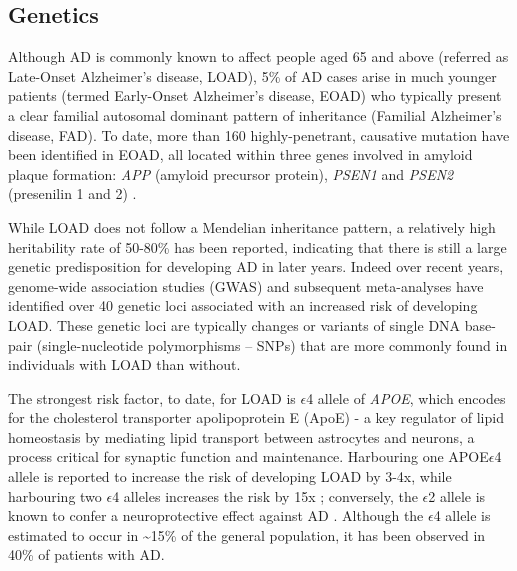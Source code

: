 \subsection{Genetics}
Although AD is commonly known to affect people aged 65 and above (referred as Late-Onset Alzheimer’s disease, LOAD), 5\% of AD cases arise in much younger patients (termed Early-Onset Alzheimer’s disease, EOAD) who typically present a clear familial autosomal dominant pattern of inheritance (Familial Alzheimer’s disease, FAD)\cite{Jarmolowicz2015}. To date, more than 160 highly-penetrant, causative mutation have been identified in EOAD, all located within three genes involved in amyloid plaque formation: \textit{APP} (amyloid precursor protein), \textit{PSEN1} and \textit{PSEN2} (presenilin 1 and 2) \cite{LM2010,Chai2007}. %

While LOAD does not follow a Mendelian inheritance pattern, a relatively high heritability rate of 50-80\% \cite{Gatz2006} has been reported, indicating that there is still a large genetic predisposition for developing AD in later years. Indeed over recent years, genome-wide association studies (GWAS) and subsequent meta-analyses \cite{Bellenguez2020,Naj2020,Kunkle2019,Jansen2019,Lambert2013,Naj2011,Hollingworth2011,Harold2009,Lambert2009,Bertram2008} have identified over 40 genetic loci associated with an increased risk of developing LOAD. These genetic loci are typically changes or variants of single DNA base-pair (single-nucleotide polymorphisms – SNPs) that are more commonly found in individuals with LOAD than without. 

The strongest risk factor, to date, for LOAD is $\epsilon$4 allele of \textit{APOE}\cite{Lambert2013}, which encodes for the cholesterol transporter apolipoprotein E (ApoE) - a key regulator of lipid homeostasis by mediating lipid transport between astrocytes and neurons, a process critical for synaptic function and maintenance\cite{DH2001}. Harbouring one APOE$\epsilon$4 allele is reported to increase the risk of developing LOAD by 3-4x, while harbouring two $\epsilon$4 alleles increases the risk by 15x \cite{Farrer1997}; conversely, the $\epsilon$2 allele is known to confer a neuroprotective effect against AD \cite{Nagy1995,EH1994}. Although the $\epsilon$4 allele is estimated to occur in \textasciitilde 15\% of the general population, it has been observed in 40\% of patients with AD\cite{Farrer1997}. 


